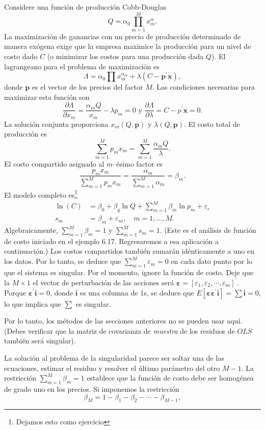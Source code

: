 Considere una función de producción Cobb-Douglas \[ Q = \alpha_{0}\prod_{m=1}^{M} x^{\alpha}_{m}. \] La maximización de ganancias con un precio de producción determinado de manera exógena exige que la empresa maximice la producción para un nivel de costo dado $C$ (o minimizar los costos para una producción dada $Q$). El lagrangeano para el problema de maximización es \[ \Lambda=\alpha_{0}\prod x^{\alpha_{m}}_{m} + \lambda(C-\bm{p}^{\prime}\bm{x}), \] donde $\bm{p}$ es el vector de los precios del factor $M$. Las condiciones necesarias para maximizar esta función son \[ \frac{\partial\Lambda}{\partial x_{m}}=\frac{\alpha_{m}Q}{x_{m}}-\lambda p_{m}=0\text{ y }\frac{\partial\Lambda}{\partial\lambda}=C-p^{\prime}\bm{x}=0. \]
La solución conjunta proporciona $x_{m}\left(Q, \bm{p}\right) $ y $\lambda\left(Q, \bm{p}\right)$. El costo total de producción es \[ \sum_{m=1}^{M}p_{m}x_{m}=\sum_{m=1}^{M}\frac{\alpha_{m}Q}{\lambda}. \]
El costo compartido asignado al $m$--ésimo factor es \[ \frac{p_{m}x_{m}}{\sum_{m=1}^{M}p_{m}x_{m}}= \frac{\alpha_{m}}
{\sum_{m=1}^{M}\alpha_{m}}=\beta_{m}. \]
El modelo completo es\footnote{Dejamos esto como ejercicio}
\begin{align*}\label{eq:mpdel}
\ln(C)&=\beta_{0} + \beta_{q} \ln Q + \sum_{m=1}^{M}\beta_{m} \ln p_{m} + \varepsilon_{c}\\
s_{m}&=\beta_{m}+\varepsilon_{m},\quad m=1,\ldots,M.
\end{align*}
Algebraicamente, $\sum_{m=1}^{M}\beta_{m}=1$ y $\sum_{m=1}^{M}s_{m} = 1$. (Este es el análisis de función de costo iniciado en el ejemplo 6.17. Regresaremos a esa aplicación a continuación.) Los costos compartidos también sumarán idénticamente a uno en los datos. Por lo tanto, se deduce que $\sum_{m=1}^{M}\varepsilon_{m}=0$ en cada dato punto por lo que el sistema es singular. Por el momento, ignore la función de costo. Deje que la $M\times1$ el vector de perturbación de las acciones será $\bm{\varepsilon}={\left[\varepsilon_{1}, \varepsilon_{2},\cdots,\varepsilon_{m}\right]}^{\prime}$. Porque $\bm{\varepsilon}^{\prime}\bm{i}=0$, donde $\bm{i}$ es una columna de 1s, se deduce que $E[\bm{\varepsilon}\bm{\varepsilon}^{\prime}\bm{i}]=\bm{\sum}\bm{i}=0$, lo que implica que $\bm{\sum}$ es singular.

Por lo tanto, los métodos de las secciones anteriores no se pueden usar aquí. (Debes verificar que la matriz de covarianza de \emph{muestra} de los residuos de $OLS$ también será singular).

La solución al problema de la singularidad parece ser soltar una de las ecuaciones, estimar el residuo y resolver el último parámetro del otro $M-1$. La restricción $\sum_{m=1}^{M}\beta_{m}=1$ establece que la función de costo debe ser homogénea de grado uno en los precios. Si imponemos la restricción
\begin{equation}\label{eq:betaestimaters}
\beta_{M} = 1 - \beta_{1} -\beta_{2} - \cdots - \beta_{M-1},
\end{equation}

